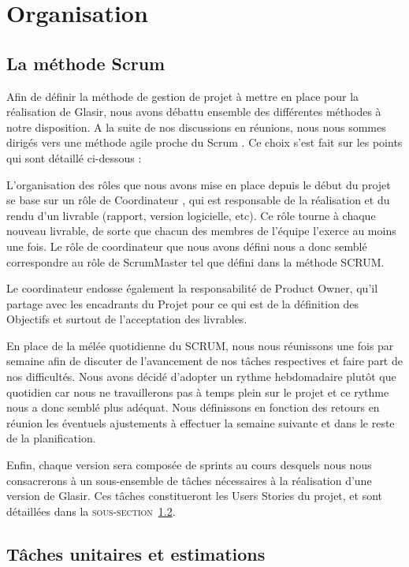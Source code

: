 \section{Organisation}
	\label{sec:orga}
	\subsection{La méthode Scrum}
		\label{subsec:scrum}

	Afin de définir la méthode de gestion de projet à mettre en place pour la réalisation de Glasir, nous avons débattu ensemble des différentes méthodes à notre disposition. A la suite de 	nos discussions en réunions, nous nous sommes dirigés vers une méthode agile proche du \og Scrum \fg{}. Ce choix s'est fait sur les points qui sont détaillé ci-dessous :

	L'organisation des rôles que nous avons mise en place depuis le début du projet se base sur un rôle de \og Coordinateur \fg{}, qui est responsable de la réalisation et du rendu d'un livrable (rapport, version logicielle, etc). Ce rôle tourne à chaque nouveau livrable, de sorte que chacun des membres de l'équipe l'exerce au moins une fois. Le rôle de coordinateur que nous avons défini nous a donc semblé correspondre au rôle de ScrumMaster tel que défini dans la méthode SCRUM.

	Le coordinateur endosse également la responsabilité de Product Owner, qu'il partage avec les encadrants du Projet pour ce qui est de la définition des Objectifs et surtout de l'acceptation des livrables.

	En place de la mélée quotidienne du SCRUM, nous nous réunissons une fois par semaine afin de discuter de l'avancement de nos tâches respectives et faire part de nos difficultés. Nous avons décidé d'adopter un rythme hebdomadaire plutôt que quotidien car nous ne travaillerons pas à temps plein sur le projet et ce rythme nous a donc semblé plus adéquat. Nous définissons en fonction des retours en réunion les éventuels ajustements à effectuer la semaine suivante et dans le reste de la planification.

	Enfin, chaque version sera composée de sprints au cours desquels nous nous consacrerons à un sous-ensemble de tâches nécessaires à la réalisation d'une version de Glasir. Ces tâches constitueront les Users Stories du projet, et sont détaillées dans la \textsc{sous-section}~\ref{subsec:taches_unitaires}.  
	
	\subsection{Tâches unitaires et estimations}
		\label{subsec:taches_unitaires}

